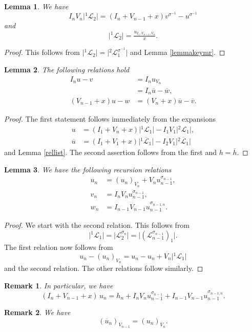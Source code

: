 \documentclass[11pt, a4paper]{amsart}
\newcommand{\eqst}[1]{\begin{equation*}#1\end{equation*}}
\theoremstyle{plain}
\newtheorem{lemma}{Lemma}[section]
\newtheorem{remark}{Remark}[section]
\numberwithin{equation}{section}
\begin{document}
\begin{lemma}
We have\eqst{I_n V_n \vert {}^1\mathcal L _2 \vert = (I_n+V_{n-1}+x)v^{\sigma^{-1}} -u^{\sigma^{-1}}} and
\eqst{\vert{}^1\mathcal L _2\vert = \tfrac{u_{I_1,V_{n-1},V_n}}{x}.}
\end{lemma}
\begin{proof}
This follows from $\vert {}^1 \mathcal L _ 2 \vert = \vert {}^2 \mathcal L^{\sigma^{-1}} _ 1 \vert$ and Lemma \ref{lemmakeymr}.
\end{proof}
\begin{lemma}
\label{keyrelation}
The following relations hold
\begin{align*}I_n u - v &= I_n u_{V_{n}} \\ &= I_n \overline u - \overline w, \\ (V_{n-1}+x)u-w &= (V_n + x)\overline u - \overline v.\end{align*}
\end{lemma}
\begin{proof}
The first statement follows immediately from the expansions \begin{align*}u &= (I_1+V_n+x)\vert {}^1 \mathcal L_1 \vert - I_1V_1\vert{}^2\mathcal L _1 \vert, \\ \overline u &= (I_1+V_1+x) \vert{}^1\overline{\mathcal L}_1\vert-I_2V_1 \vert{}^2\overline{\mathcal L}_1\vert\end{align*} and Lemma \ref{rellist}. The second assertion follows from the first and $h = \overline h.$
\end{proof}

\begin{lemma}
\label{lemmarecursion}
We have the following recursion relations \begin{align*}
u_n &= (u_n)_{V_n}+V_n u_{n-1}^{\sigma_{n-1}}, \\
v_{n} &= I_{n}V_{n} u_{n-1}^{\sigma_{n-1}}, \\
w_{n} &= I_{n-1}V_{n-1}u_{n-1}^{\sigma_{n-1,n}}. 
\end{align*}

\end{lemma}
\begin{proof}
We start with the second relation. This follows from \eqst{ \vert {}^1\mathcal L _1 \vert = \vert\mathcal L^{\sigma_n}_2\vert = \vert (\mathcal L_{n-1}^{\sigma_{n-1}})_1 \vert.} The first relation now follows from \eqst{u_n - (u_n)_{V_n} = u_n - u_n + V_n \vert{}^1\mathcal L_1 \vert} and the second relation. The other relations follow similarly.
\end{proof}
\begin{remark}
In particular, we have \eqst{(I_n+V_{n-1}+x) \, u_n = h_n +I_nV_n u_{n-1}^{\sigma_{n-1}}+I_{n-1}V_{n-1} u_{n-1}^{\sigma_{n-1,n}}.}
\end{remark}
\begin{remark}
We have \eqst{(\overline u _ n)_{V_{n-1}} = (u_n)_{V_n} .}
\end{remark}
\end{document}
